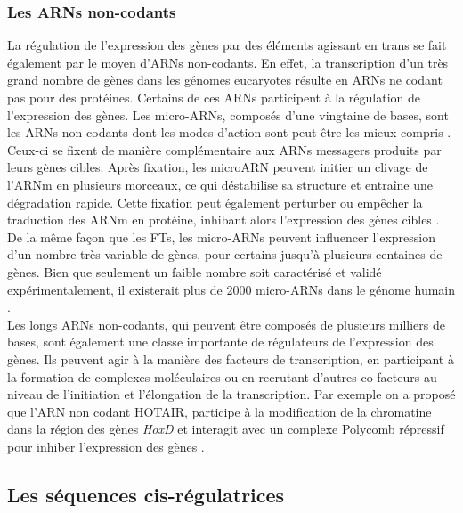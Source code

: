 \subsubsection{Les \acrshort{ARN}s non-codants}
\label{subsubsec:ARN-noncodant}

La régulation de l’expression des gènes par des éléments agissant en trans se fait également par le moyen d’\acrshort{ARN}s non-codants. En effet, la transcription d’un très grand nombre de gènes dans les génomes eucaryotes résulte en \acrshort{ARN}s ne codant pas pour des protéines. Certains de ces \acrshort{ARN}s participent à la régulation de l’expression des gènes. Les micro-\acrshort{ARN}s, composés d’une vingtaine de bases, sont les \acrshort{ARN}s non-codants dont les modes d’action sont peut-être les mieux compris \citep{bartel_micrornas_2004}. Ceux-ci se fixent de manière complémentaire aux \acrshort{ARN}s messagers produits par leurs gènes cibles. Après fixation, les microARN peuvent initier un clivage de l’\acrshort{ARNm} en plusieurs morceaux, ce qui déstabilise sa structure et entraîne une dégradation rapide. Cette fixation peut également perturber ou empêcher la traduction des \acrshort{ARNm} en protéine, inhibant alors l’expression des gènes cibles \citep{bartel_micrornas_2004}. De la même façon que les \acrshort{FT}s, les micro-\acrshort{ARN}s peuvent influencer l’expression d’un nombre très variable de gènes, pour certains jusqu’à plusieurs centaines de gènes. Bien que seulement un faible nombre soit caractérisé et validé expérimentalement, il existerait plus de 2000 micro-\acrshort{ARN}s dans le génome humain \citep{alles_estimate_2019}.\\

Les longs \acrshort{ARN}s non-codants, qui peuvent être composés de plusieurs milliers de bases, sont également une classe importante de régulateurs de l’expression des gènes. Ils peuvent agir à la manière des facteurs de transcription, en participant à la formation de complexes moléculaires ou en recrutant d’autres co-facteurs au niveau de l'initiation et l’élongation de la transcription. Par exemple on a proposé que l’ARN non codant HOTAIR, participe à la modification de la chromatine dans la région des gènes \textit{HoxD} et interagit avec un complexe Polycomb répressif pour inhiber l’expression des gènes \citep{rinn_functional_2007}.

\subsection{Les séquences \gls{cis}-régulatrices}
\label{subsec:elem-cis}

